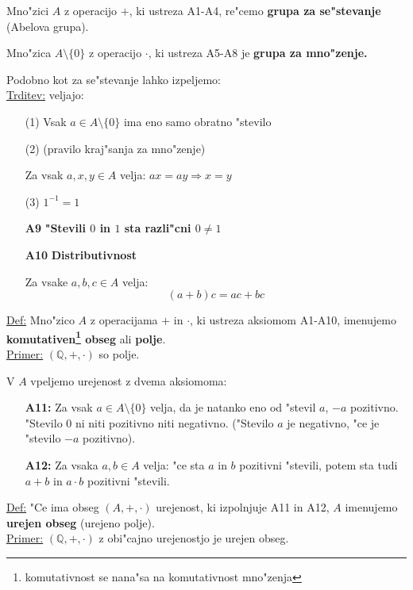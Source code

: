 Mno"zici \(A\) z operacijo \(+\), ki ustreza A1-A4, re"cemo \textbf{grupa za se"stevanje} (Abelova grupa).

Mno"zica \(A \setminus \{0\}\) z operacijo \(\cdot\), ki ustreza A5-A8 je \textbf{grupa za mno"zenje.}

Podobno kot za se"stevanje lahko izpeljemo:\\
\underline{Trditev:} veljajo:
\begin{itemize}
	\item[(1)] Vsak \(a \in A \setminus \{0\}\) ima eno samo obratno "stevilo
	\item[(2)] (pravilo kraj"sanja za mno"zenje)

	Za vsak \(a, x, y \in A\) velja: \(ax = ay \Rightarrow x = y\)
	\item[(3)] \(1^{-1} = 1\)
\end{itemize}

\begin{itemize}
	\item[\textbf{A9}] \textbf{"Stevili \(0\) in \(1\) sta razli"cni \(0 \neq 1\)}
	\item[\textbf{A10}] \textbf{Distributivnost}
	
	Za vsake \(a, b, c \in A\) velja:
	\[(a + b)c = ac + bc\]
\end{itemize}

\underline{Def:} Mno"zico \(A\) z operacijama \(+\) in \(\cdot\), ki ustreza aksiomom A1-A10, imenujemo \textbf{komutativen\footnote{komutativnost se nana"sa na komutativnost mno"zenja} obseg} ali \textbf{polje}.\\
\underline{Primer:} \((\mathbb{Q}, +, \cdot)\) so polje.

V \(A\) vpeljemo urejenost z dvema aksiomoma:
\begin{itemize}
	\item[\textbf{A11:}] Za  vsak \(a \in A \setminus \{0\}\) velja, da je natanko eno od "stevil \(a\), \(-a\) pozitivno. "Stevilo \(0\) ni niti pozitivno niti negativno. ("Stevilo \(a\) je negativno, "ce je "stevilo \(-a\) pozitivno).
	\item[\textbf{A12:}] Za vsaka \(a, b \in A\) velja: "ce sta \(a\) in \(b\) pozitivni "stevili, potem sta tudi \(a + b\) in \(a \cdot b\) pozitivni "stevili.
\end{itemize}

\underline{Def:} "Ce ima obseg \((A, +, \cdot)\) urejenost, ki izpolnjuje A11 in A12, \(A\) imenujemo \textbf{urejen obseg} (urejeno polje).\\
\underline{Primer:} \((\mathbb{Q}, +, \cdot)\) z obi"cajno urejenostjo je urejen obseg.

